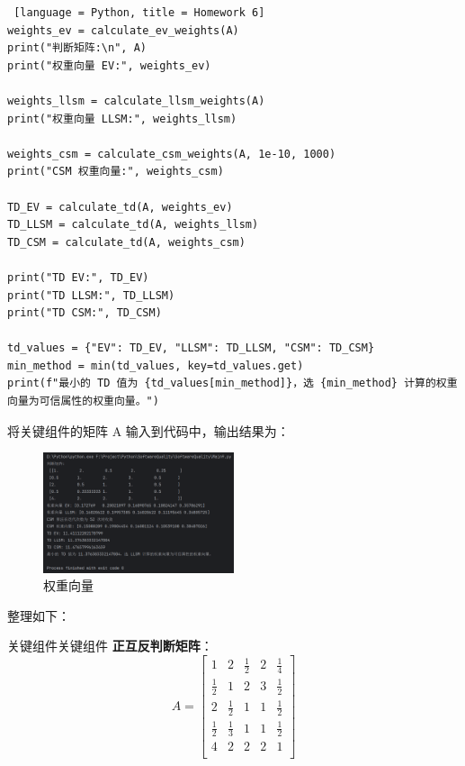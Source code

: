 \documentclass[14pt,a4paper,UTF8,twoside]{article}
\begin{document}
\begin{lstlisting} [language = Python, title = Homework 6]
weights_ev = calculate_ev_weights(A)
print("判断矩阵:\n", A)
print("权重向量 EV:", weights_ev)

weights_llsm = calculate_llsm_weights(A)
print("权重向量 LLSM:", weights_llsm)

weights_csm = calculate_csm_weights(A, 1e-10, 1000)
print("CSM 权重向量:", weights_csm)

TD_EV = calculate_td(A, weights_ev)
TD_LLSM = calculate_td(A, weights_llsm)
TD_CSM = calculate_td(A, weights_csm)

print("TD EV:", TD_EV)
print("TD LLSM:", TD_LLSM)
print("TD CSM:", TD_CSM)

td_values = {"EV": TD_EV, "LLSM": TD_LLSM, "CSM": TD_CSM}
min_method = min(td_values, key=td_values.get)
print(f"最小的 TD 值为 {td_values[min_method]}，选 {min_method} 计算的权重向量为可信属性的权重向量。")
\end{lstlisting}

将关键组件的矩阵 A 输入到代码中，输出结果为：

\begin{figure} [H]
    \centering
    \includegraphics[width = 0.5\textwidth]{img9/weights.png}
    \caption{权重向量}
    \label{fig:first}
\end{figure}

整理如下：

\begin{ans}{关键组件}{关键组件}
    \textbf{正互反判断矩阵}：
    \[
    A = 
    \begin{bmatrix}
    1 & 2 & \frac{1}{2} & 2 & \frac{1}{4} \\
    \frac{1}{2} & 1 & 2 & 3 & \frac{1}{2} \\
    2 & \frac{1}{2} & 1 & 1 & \frac{1}{2} \\
    \frac{1}{2} & \frac{1}{3} & 1 & 1 & \frac{1}{2} \\
    4 & 2 & 2 & 2 & 1 \\
    \end{bmatrix}
    \]
  \end{ans}
    
  \bigskip
    
\end{document}

